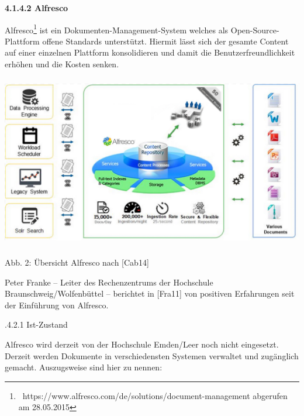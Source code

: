 \documentclass[a4paper]{article}
\begin{document}
\bigskip


\bigskip


\bigskip


\bigskip


\bigskip


\bigskip


\bigskip


\bigskip

{\sffamily
\textbf{4.1.4.2 Alfresco}}


\bigskip

{\sffamily
Alfresco\footnote{\ https://www.alfresco.com/de/solutions/document-management abgerufen am 28.05.2015} ist ein
Dokumenten-Management-System welches als Open-Source-Plattform offene Standards unterstützt. Hiermit lässt sich der
gesamte Content auf einer einzelnen Plattform konsolidieren und damit die Benutzerfreundlichkeit erhöhen und die Kosten
senken.}


\bigskip

 \includegraphics[width=14.215cm,height=7.588cm]{INMEA5BeckmannMarco-img002.png} 

{\centering\sffamily
Abb. 2: Übersicht Alfresco nach [Cab14]
\par}


\bigskip

{\sffamily
Peter Franke – Leiter des Rechenzentrums der Hochschule Braunschweig/Wolfenbüttel – berichtet in [Fra11] von positiven
Erfahrungen seit der Einführung von Alfresco.}


\bigskip

{.4.2.1 Ist-Zustand}


\bigskip

{\sffamily
Alfresco wird derzeit von der Hochschule Emden/Leer noch nicht eingesetzt. Derzeit werden Dokumente in verschiedensten
Systemen verwaltet und zugänglich gemacht. Auszugsweise sind hier zu nennen:}
\end{document}
